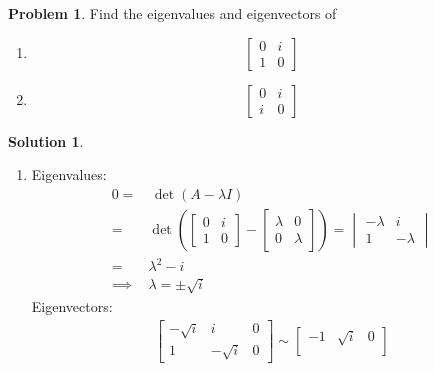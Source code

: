 \documentclass[10pt]{article}
\theoremstyle{definition}
\newtheorem{problem}{Problem}
\newtheorem{soln}{Solution}
\begin{document}
\begin{problem} Find the eigenvalues and eigenvectors of
\begin{enumerate}[label=(\alph*)]
  \item $$\begin{bmatrix}
            0 & i \\
            1 & 0
          \end{bmatrix}$$
  \item $$\begin{bmatrix}
            0 & i \\
            i & 0
          \end{bmatrix}$$
\end{enumerate}
\end{problem}
\begin{soln}~
  \begin{enumerate}[label=(\alph*)]
    \item Eigenvalues:
          \begin{align*}
            0 =      & \,\det(A-\lambda I) \\
            =        &
            \det(\begin{bmatrix}
                     0 & i \\
                     1 & 0
                   \end{bmatrix}
            -
            \begin{bmatrix}
                \lambda & 0       \\
                0       & \lambda
              \end{bmatrix})
            =
            \begin{vmatrix}
              -\lambda & i        \\
              1        & -\lambda
            \end{vmatrix}            \\
            =        & \lambda^2-i         \\
            \implies & \lambda=\pm\sqrt{i}
          \end{align*}
          Eigenvectors:
          \begin{align*}
            \begin{bmatrix}
              -\sqrt{i} & i         & 0 \\
              1         & -\sqrt{i} & 0
            \end{bmatrix}\sim
            \begin{bmatrix}
              -1 & \sqrt{i}  & 0 \\

\end{bmatrix}
\end{align*}
\end{enumerate}
\end{soln}
\end{document}
